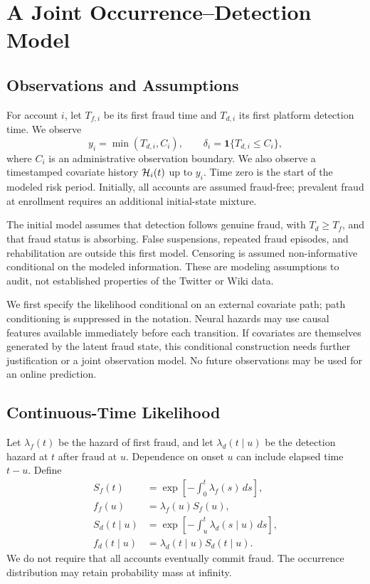 \section{A Joint Occurrence--Detection Model}
\subsection{Observations and Assumptions}
For account $i$, let $T_{f,i}$ be its first fraud time and $T_{d,i}$ its first
platform detection time. We observe
\[
 y_i=\min(T_{d,i},C_i),\qquad
 \delta_i=\mathbf{1}\{T_{d,i}\le C_i\},
\]
where $C_i$ is an administrative observation boundary. We also observe a
timestamped covariate history $\mathcal{H}_i(t)$ up to $y_i$. Time zero is the start
of the modeled risk period. Initially, all accounts are assumed fraud-free;
prevalent fraud at enrollment requires an additional initial-state mixture.

The initial model assumes that detection follows genuine fraud, with
$T_d\ge T_f$, and that fraud status is absorbing. False suspensions,
repeated fraud episodes, and rehabilitation are outside this first model.
Censoring is assumed non-informative conditional on the modeled information.
These are modeling assumptions to audit, not established properties of the
Twitter or Wiki data.

We first specify the likelihood conditional on an external covariate path;
path conditioning is suppressed in the notation. Neural hazards may use
causal features available immediately before each transition. If covariates
are themselves generated by the latent fraud state, this conditional
construction needs further justification or a joint observation model.
No future observations may be used for an online prediction.

\subsection{Continuous-Time Likelihood}
Let $\lambda_f(t)$ be the hazard of first fraud, and let
$\lambda_d(t\mid u)$ be the detection hazard at $t$ after fraud at $u$.
Dependence on onset $u$ can include elapsed time $t-u$. Define
\begin{align}
 S_f(t)&=\exp\left[-\int_0^t\lambda_f(s)\,ds\right],\\
 f_f(u)&=\lambda_f(u)S_f(u),\\
 S_d(t\mid u)&=\exp\left[-\int_u^t\lambda_d(s\mid u)\,ds\right],\\
 f_d(t\mid u)&=\lambda_d(t\mid u)S_d(t\mid u).
\end{align}
We do not require that all accounts eventually commit fraud. The
occurrence distribution may retain probability mass at infinity.

